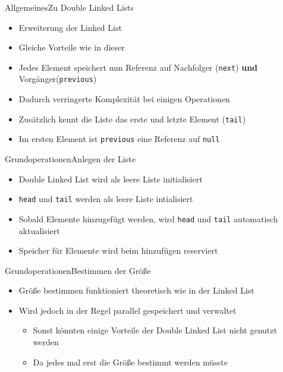 \begin{frame}{Allgemeines}{Zu Double Linked Lists}
	\begin{itemize}
		\item Erweiterung der Linked List
		\item Gleiche Vorteile wie in dieser
		\item Jedes Element speichert nun Referenz auf Nachfolger (\texttt{next}) \textbf{und} Vorgänger(\texttt{previous})
		\item Dadurch verringerte Komplexität bei einigen Operationen
		\item Zusätzlich kennt die Liste das erste und letzte Element (\texttt{tail})
		\item Im ersten Element ist \texttt{previous} eine Referenz auf \texttt{null}
	\end{itemize}
\end{frame}

\begin{frame}{Grundoperationen}{Anlegen der Liste}
	\begin{itemize}
		\item Double Linked List wird als leere Liste initialisiert
		\item \texttt{head} und \texttt{tail} werden als leere Liste intialisiert
		\item Sobald Elemente hinzugefügt werden, wird \texttt{head} und \texttt{tail} automatisch aktualisiert
		\item Speicher für Elemente wird beim hinzufügen reserviert
	\end{itemize}
\end{frame}

\begin{frame}{Grundoperationen}{Bestimmen der Größe}
	\begin{itemize}
		\item Größe bestimmen funktioniert theoretisch wie in der Linked List
		\item Wird jedoch in der Regel parallel gespeichert und verwaltet
		\begin{itemize}
			\item Sonst könnten einige Vorteile der Double Linked List nicht genutzt werden
			\item Da jedes mal erst die Größe bestimmt werden müsste
		\end{itemize}
	\end{itemize}
\end{frame}

